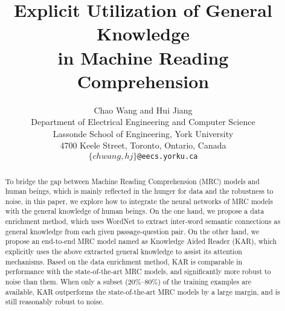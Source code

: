 \documentclass[11pt,a4paper]{article}
\title{Explicit Utilization of General Knowledge \\ in Machine Reading Comprehension}
\author{
Chao Wang and Hui Jiang \\
Department of Electrical Engineering and Computer Science \\
Lassonde School of Engineering, York University \\
4700 Keele Street, Toronto, Ontario, Canada \\
{\tt $\{chwang, hj\}$@eecs.yorku.ca}
}
\date{}
\begin{document}
\maketitle
\begin{abstract}
To bridge the gap between Machine Reading Comprehension (MRC) models and human beings, which is mainly reflected in the hunger for data and the robustness to noise, in this paper, we explore how to integrate the neural networks of MRC models with the general knowledge of human beings. On the one hand, we propose a data enrichment method, which uses WordNet to extract inter-word semantic connections as general knowledge from each given passage-question pair. On the other hand, we propose an end-to-end MRC model named as Knowledge Aided Reader (KAR), which explicitly uses the above extracted general knowledge to assist its attention mechanisms. Based on the data enrichment method, KAR is comparable in performance with the state-of-the-art MRC models, and significantly more robust to noise than them. When only a subset ($20\%$--$80\%$) of the training examples are available, KAR outperforms the state-of-the-art MRC models by a large margin, and is still reasonably robust to noise.
\end{abstract}
\end{document}
